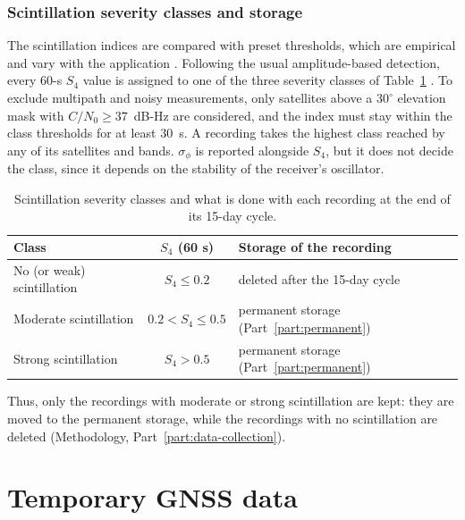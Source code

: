 \documentclass{article}
\makeatletter
\let\old@part\part
\renewcommand{\part}{\clearpage\old@part}
\makeatother
\begin{document}
\section{Scintillation severity classes and storage}
\label{sec:scintillation-classes}

The scintillation indices are compared with preset thresholds, which are empirical and vary with the application \cite{vandierendonckMeasuringIonosphericScintillation2004,jiaoComparisonEffectHighlatitude2015}. Following the usual amplitude-based detection, every 60-s $S_4$ value is assigned to one of the three severity classes of Table~\ref{tab:scintillation-classes} \cite{jiaoComparisonEffectHighlatitude2015}. To exclude multipath and noisy measurements, only satellites above a $30^\circ$ elevation mask with $C/N_0 \geq 37$~dB-Hz are considered, and the index must stay within the class thresholds for at least 30~s. A recording takes the highest class reached by any of its satellites and bands. $\sigma_\phi$ is reported alongside $S_4$, but it does not decide the class, since it depends on the stability of the receiver's oscillator.

\begin{table}[H]
  \centering
  \begin{tabular}{|l|c|l|}
    \hline
    \textbf{Class} & \textbf{$S_4$ (60 s)} & \textbf{Storage of the recording} \\
    \hline
    No (or weak) scintillation & $S_4 \leq 0.2$ & deleted after the 15-day cycle \\
    \hline
    Moderate scintillation & $0.2 < S_4 \leq 0.5$ & permanent storage (Part~\ref{part:permanent}) \\
    \hline
    Strong scintillation & $S_4 > 0.5$ & permanent storage (Part~\ref{part:permanent}) \\
    \hline
  \end{tabular}
  \caption{Scintillation severity classes and what is done with each recording at the end of its 15-day cycle.}
  \label{tab:scintillation-classes}
\end{table}

Thus, only the recordings with moderate or strong scintillation are kept: they are moved to the permanent storage, while the recordings with no scintillation are deleted (Methodology, Part~\ref{part:data-collection}).

\newpage

\part{Temporary GNSS data}
\label{part:temporary}
\end{document}
